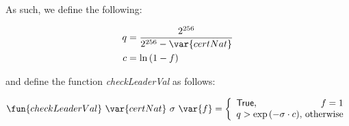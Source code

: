 As such, we define the following:

\begin{align*}
  q & = \frac{2^{256}}{2^{256} - \var{certNat}} \\
  c & = \ln{(1 - f)}
\end{align*}

and define the function \textit{checkLeaderVal} as follows:

\begin{equation*}
  \fun{checkLeaderVal}~\var{certNat}~\sigma~\var{f} =
    \left\{
      \begin{array}{l@{~}r}
        \mathsf{True}, & f = 1 \\
        q > \exp{(-\sigma \cdot c)}, & \text{otherwise}
      \end{array}
    \right.
\end{equation*}
